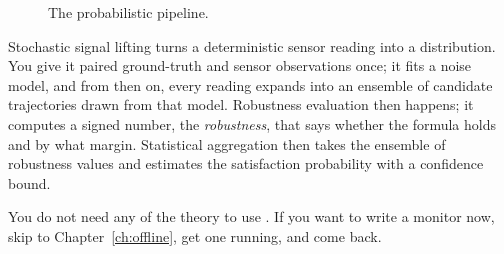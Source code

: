 \begin{figure}[h]
\centering
\begin{widefig}\end{widefig}
\caption{The probabilistic pipeline.}
\label{fig:pipeline}
\end{figure}

Stochastic signal lifting turns a deterministic sensor reading into a distribution. You give it paired ground-truth and sensor observations once; it fits a noise model, and from then on, every reading expands into an ensemble of candidate trajectories drawn from that model. Robustness evaluation then happens; it computes a signed number, the \emph{robustness}, that says whether the formula holds and by what margin. Statistical aggregation then takes the ensemble of robustness values and estimates the satisfaction probability with a confidence bound.

\begin{notebox}
You do not need any of the theory to use \sentil. If you want to write a monitor now, skip to Chapter~\ref{ch:offline}, get one running, and come back.
\end{notebox}